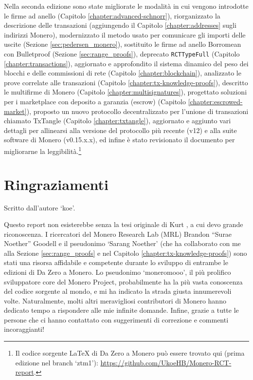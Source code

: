 Nella seconda edizione sono state migliorate le modalità in cui vengono introdotte le firme ad anello (Capitolo \ref{chapter:advanced-schnorr}), riorganizzato la descrizione delle transazioni (aggiungendo il Capitolo \ref{chapter:addresses} sugli indirizzi Monero), modernizzato il metodo usato per comunicare gli importi delle uscite (Sezione \ref{sec:pedersen_monero}), sostituito le firme ad anello Borromean con Bulletproof (Sezione \ref{sec:range_proofs}), deprecato {\tt RCTTypeFull} (Capitolo \ref{chapter:transactions}), aggiornato e approfondito il sistema dinamico del peso dei blocchi e delle commissioni di rete (Capitolo \ref{chapter:blockchain}), analizzato le prove correlate alle transazioni (Capitolo \ref{chapter:tx-knowledge-proofs}), descritto le multifirme di Monero (Capitolo \ref{chapter:multisignatures}), progettato soluzioni per i marketplace con deposito a garanzia (escrow) (Capitolo \ref{chapter:escrowed-market}), proposto un nuovo protocollo decentralizzato per l'unione di transazioni chiamato TxTangle (Capitolo \ref{chapter:txtangle}), aggiornato e aggiunto vari dettagli per allinearsi alla versione del protocollo più recente (v12) e alla suite software di Monero (v0.15.x.x), ed infine è stato revisionato il documento per migliorarne la leggibilità.\footnote{Il codice sorgente \LaTeX{} di Da Zero a Monero può essere trovato qui (prima edizione nel branch `ztm1'): \url{https://github.com/UkoeHB/Monero-RCT-report}.}



\section{Ringraziamenti}
\label{sec:ringraziamenti}

Scritto dall’autore `koe'.

Questo report non esisterebbe senza la tesi originale di Kurt \cite{kurt-original}, a cui devo grande riconoscenza. I ricercatori del Monero Research Lab (MRL) Brandon “Surae Noether” Goodell e il pseudonimo ‘Sarang Noether’ (che ha collaborato con me alla Sezione \ref{sec:range_proofs} e nel Capitolo \ref{chapter:tx-knowledge-proofs}) sono stati una risorsa affidabile e competente durante lo sviluppo di entrambe le edizioni di Da Zero a Monero. Lo pseudonimo ‘moneromooo’, il più prolifico sviluppatore core del Monero Project, probabilmente ha la più vasta conoscenza del codice sorgente al mondo, e mi ha indicato la strada giusta innumerevoli volte. Naturalmente, molti altri meravigliosi contributori di Monero hanno dedicato tempo a rispondere alle mie infinite domande. Infine, grazie a tutte le persone che ci hanno contattato con suggerimenti di correzione e commenti incoraggianti!